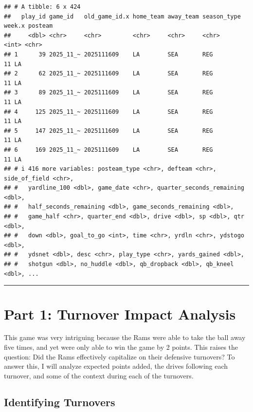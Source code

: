 \documentclass[
]{article}
\begin{document}
\begin{verbatim}
## # A tibble: 6 x 424
##   play_id game_id   old_game_id.x home_team away_team season_type week.x posteam
##     <dbl> <chr>     <chr>         <chr>     <chr>     <chr>        <int> <chr>  
## 1      39 2025_11_~ 2025111609    LA        SEA       REG             11 LA     
## 2      62 2025_11_~ 2025111609    LA        SEA       REG             11 LA     
## 3      89 2025_11_~ 2025111609    LA        SEA       REG             11 LA     
## 4     125 2025_11_~ 2025111609    LA        SEA       REG             11 LA     
## 5     147 2025_11_~ 2025111609    LA        SEA       REG             11 LA     
## 6     169 2025_11_~ 2025111609    LA        SEA       REG             11 LA     
## # i 416 more variables: posteam_type <chr>, defteam <chr>, side_of_field <chr>,
## #   yardline_100 <dbl>, game_date <chr>, quarter_seconds_remaining <dbl>,
## #   half_seconds_remaining <dbl>, game_seconds_remaining <dbl>,
## #   game_half <chr>, quarter_end <dbl>, drive <dbl>, sp <dbl>, qtr <dbl>,
## #   down <dbl>, goal_to_go <int>, time <chr>, yrdln <chr>, ydstogo <dbl>,
## #   ydsnet <dbl>, desc <chr>, play_type <chr>, yards_gained <dbl>,
## #   shotgun <dbl>, no_huddle <dbl>, qb_dropback <dbl>, qb_kneel <dbl>, ...
\end{verbatim}

\begin{center}\rule{0.5\linewidth}{0.5pt}\end{center}

\section{Part 1: Turnover Impact
Analysis}\label{part-1-turnover-impact-analysis}

This game was very intriguing because the Rams were able to take the
ball away five times, and yet were only able to win the game by 2
points. This raises the question: Did the Rams effectively capitalize on
their defensive turnovers? To answer this, I will analyze expected
points added, the drives following each turnover, and some of the
context during each of the turnovers.

\subsection{Identifying Turnovers}\label{identifying-turnovers}
\end{document}
